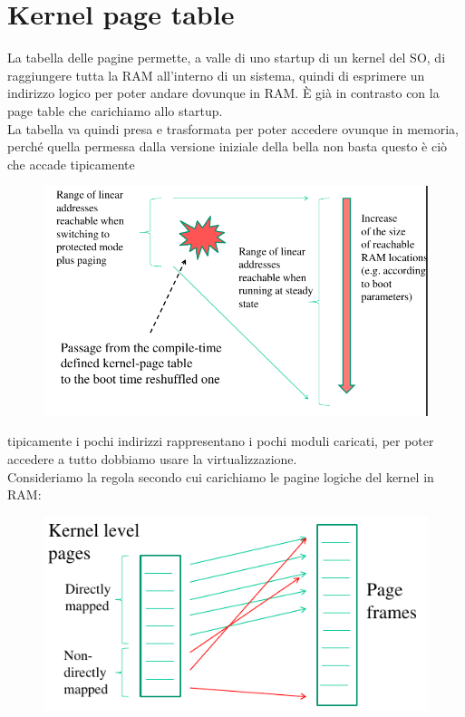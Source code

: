 \documentclass[12pt, oneside]{extbook}
\begin{document}
\section{Kernel page table}
La tabella delle pagine permette, a valle di uno startup di un kernel del SO, di raggiungere tutta la RAM all'interno di un sistema, quindi di esprimere un indirizzo logico per poter andare dovunque in RAM. È già in contrasto con la page table che carichiamo allo startup.\\La tabella va quindi presa e trasformata per poter accedere ovunque in memoria, perché quella permessa dalla versione iniziale della bella non basta
questo è ciò che accade tipicamente
\begin{figure}[!h]
	\includegraphics[scale=0.4]{immagini/init_kernel_pt.png}
\end{figure}
tipicamente i pochi indirizzi rappresentano i pochi moduli caricati, per poter accedere a tutto dobbiamo usare la virtualizzazione.\\ Consideriamo la regola secondo cui carichiamo le pagine logiche del kernel in RAM: 
\begin{figure}[!h]
	\includegraphics[scale=0.4]{immagini/direct_mapping.png}
\end{figure}
\end{document}
